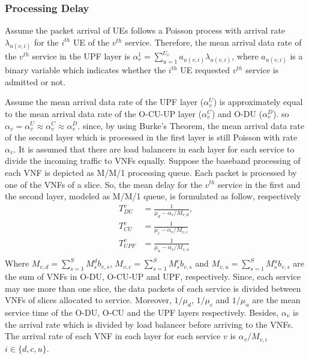 \documentclass[conference]{IEEEtran}
\begin{document}
\subsubsection{Processing Delay}
Assume the packet arrival of UEs follows a Poisson process with arrival rate $\lambda_{u(v,i)}$ for the $i^{th}$ UE of the $v^{th}$ service.
Therefore, the mean arrival data rate of the $v^{th}$ service in the UPF layer is $\alpha_{v}^1 = \sum_{u=1}^{U_v}a_{u(v,i)}\lambda_{u(v,i)}$, where $a_{u(v,i)}$ is a binary variable which indicates whether the $i^{th}$ UE requested $v^{th}$ service is admitted or not.

Assume the mean arrival data rate of the UPF layer ($\alpha_{v}^U$) is approximately equal to the mean arrival data rate of the O-CU-UP layer ($\alpha_{v}^C$) and O-DU ($\alpha_{v}^D$). so $\alpha_{v} =\alpha_{v}^U \approx \alpha_{v}^C \approx \alpha_{v}^D$. since, by using Burke’s Theorem, the mean arrival data rate of the second layer which is processed in the first layer is still Poisson with rate $\alpha_{v}$.
It is assumed that there are load balancers in each layer for each service to divide the incoming traffic to VNFs equally. %
Suppose the baseband processing of each VNF is depicted as M/M/1 processing queue.
Each packet is processed by one of the VNFs of a slice. So, the mean delay for the $v^{th}$ service in the first and the second layer, modeled as M/M/1 queue, is formulated as follow, respectively
\begin{equation}
\begin{split}
T_{DU}^{v} &= \frac{1}{\mu_d - \alpha_{v}/{M_{v,d}}},\\
T_{CU}^{v} &= \frac{1}{\mu_c - \alpha_{v}/{M_{v,c}}}\\
T_{UPF}^{v} &= \frac{1}{\mu_u - \alpha_{v}/{M_{v,u}}}\\
\end{split}
\end{equation}
Where $M_{v,d} = \sum_{s=1}^{S}M_s^{d} b_{v,s}$, $M_{v,c} = \sum_{s=1}^{S}M_s^{c} b_{v,s}$ and 
$M_{v,u} = \sum_{s=1}^{S}M_s^{u} b_{v,s}$ 
are the sum of VNFs in O-DU, O-CU-UP and UPF, respectively. Since, each service may use more than one slice, the data packets of each service is divided between VNFs of slices allocated to service.
Moreover, $1/\mu_d$, $1/\mu_c$ and $1/\mu_u$ are the mean service time of the O-DU, O-CU and the UPF layers respectively.
Besides, $\alpha_{v}$ is the  arrival rate which is divided
by load balancer before arriving to the VNFs. The arrival rate of each VNF in each layer for each service 
$v$ is $\alpha_{v}/{M_{v,i}}$ $ i \in \{d,c, u\}$.
\end{document}
